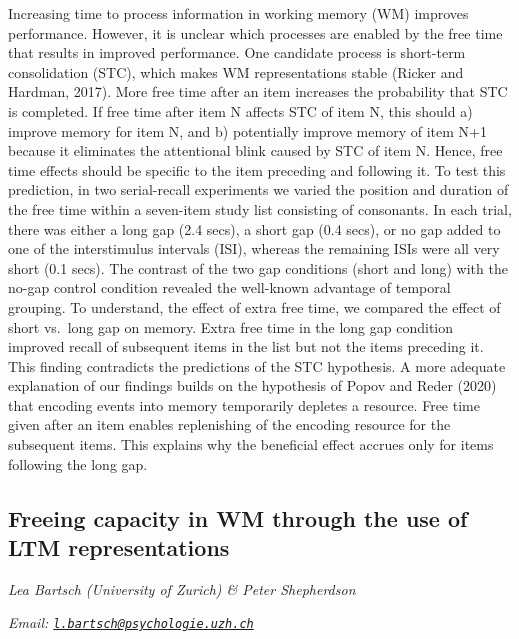 \documentclass[12pt,]{book}
\begin{document}
Increasing time to process information in working memory (WM) improves performance. However, it is unclear which processes are enabled by the free time that results in improved performance. One candidate process is short-term consolidation (STC), which makes WM representations stable (Ricker and Hardman, 2017). More free time after an item increases the probability that STC is completed. If free time after item N affects STC of item N, this should a) improve memory for item N, and b) potentially improve memory of item N+1 because it eliminates the attentional blink caused by STC of item N. Hence, free time effects should be specific to the item preceding and following it. To test this prediction, in two serial-recall experiments we varied the position and duration of the free time within a seven-item study list consisting of consonants. In each trial, there was either a long gap (2.4 secs), a short gap (0.4 secs), or no gap added to one of the interstimulus intervals (ISI), whereas the remaining ISIs were all very short (0.1 secs). The contrast of the two gap conditions (short and long) with the no-gap control condition revealed the well-known advantage of temporal grouping. To understand, the effect of extra free time, we compared the effect of short vs.~long gap on memory. Extra free time in the long gap condition improved recall of subsequent items in the list but not the items preceding it. This finding contradicts the predictions of the STC hypothesis. A more adequate explanation of our findings builds on the hypothesis of Popov and Reder (2020) that encoding events into memory temporarily depletes a resource. Free time given after an item enables replenishing of the encoding resource for the subsequent items. This explains why the beneficial effect accrues only for items following the long gap.

\hypertarget{freeing-capacity-in-wm-through-the-use-of-ltm-representations}{%
\subsection{Freeing capacity in WM through the use of LTM representations}\label{freeing-capacity-in-wm-through-the-use-of-ltm-representations}}

\emph{Lea Bartsch (University of Zurich) \& Peter Shepherdson}

\emph{Email: \href{mailto:l.bartsch@psychologie.uzh.ch}{\nolinkurl{l.bartsch@psychologie.uzh.ch}}}
\end{document}
